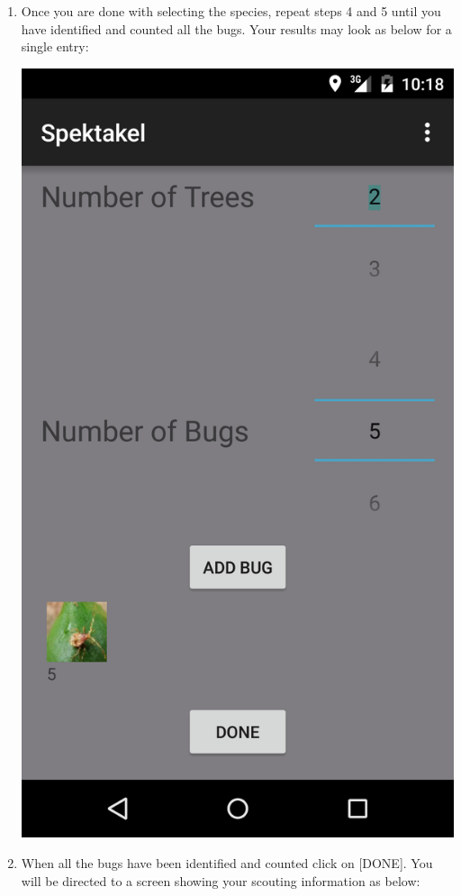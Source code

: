 \documentclass[11pt,a4paper,titlepage]{article}
\begin{document}
\begin{enumerate}
\item Once you are done with selecting the species, repeat steps 4 and 5 until you have identified and counted all the bugs. Your results may look as below for a single entry:

\begin{center}
				\includegraphics[scale=0.13]{shot5}
			\end{center}

\item When all the bugs have been identified and counted click on [DONE]. You will be directed to a screen showing your scouting information as below:


\end{enumerate}
\end{document}
